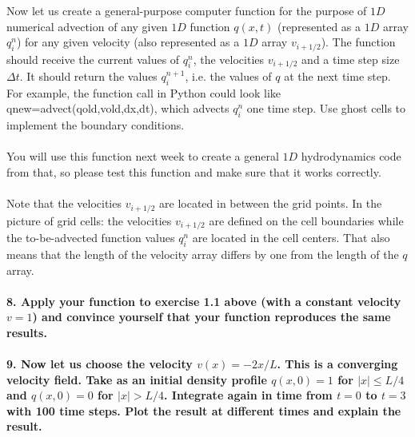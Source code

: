 Now let us create a general-purpose computer function for 
the purpose of $1D$ numerical advection of any given $1D$ 
function $q(x, t)$ (represented as a $1D$ array $q^n_i$) 
for any given velocity (also represented as a $1D$ array 
$v_{i+1/2}$). The function should receive the current
values of $q^n_i$, the velocities $v_{i+1/2}$ and a time 
step size $\Delta t$. It should return the values 
$q^{n+1}_i$, i.e. the values of $q$ at the next time step. 
For example, the function call in Python could look like 
qnew=advect(qold,vold,dx,dt), which advects $q^n_i$ one 
time step. Use ghost cells to implement the boundary 
conditions. \\
\\
You will use this function next week to create 
a general $1D$ hydrodynamics code from that, so please test 
this function and make sure that it works correctly. \\
\\
Note that the velocities $v_{i+1/2}$ are located in between 
the grid points. In the picture of grid cells: the 
velocities $v_{i+1/2}$ are defined on the cell boundaries 
while the to-be-advected function values $q^n_i$ are 
located in the cell centers. That also means that the 
length of the velocity array differs by one from the 
length of the $q$ array.

\paragraph{8. Apply your function to exercise 1.1 above 
    (with a constant velocity $v=1$) and convince yourself 
    that your function reproduces the same results.
}

\paragraph{9. Now let us choose the velocity $v(x)=-2x/L$. 
    This is a converging velocity field. Take as an initial 
    density profile $q(x, 0)=1$ for $|x|\le L/4$ and 
    $q(x,0)=0$ for $|x|>L/4$. Integrate again in time from 
    $t=0$ to $t=3$ with 100 time steps. Plot the result at 
    different times and explain the result.
}
